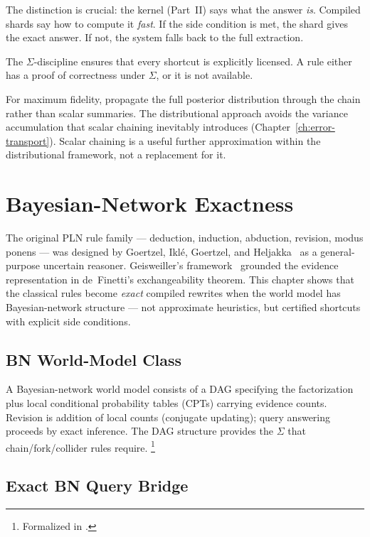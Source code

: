 \documentclass[11pt,openany]{report}
\begin{document}
The distinction is crucial: the kernel (Part~II) says what the answer
\emph{is}.  Compiled shards say how to compute it \emph{fast}.  If
the side condition is met, the shard gives the exact answer.  If not,
the system falls back to the full extraction.

The $\Sigma$-discipline ensures that every shortcut is explicitly
licensed.  A rule either has a proof of correctness under $\Sigma$,
or it is not available.

For maximum fidelity, propagate the full posterior distribution
through the chain rather than scalar summaries.  The distributional
approach avoids the variance accumulation that scalar chaining
inevitably introduces (Chapter~\ref{ch:error-transport}).  Scalar
chaining is a useful further approximation within the distributional
framework, not a replacement for it.


\chapter{Bayesian-Network Exactness}
\label{ch:bn-models}

The original PLN rule family --- deduction, induction, abduction,
revision, modus ponens --- was designed by Goertzel, Iklé, Goertzel,
and Heljakka~\cite{goertzel2009pln} as a general-purpose uncertain
reasoner.  Geisweiller's \nuPLN{} framework~\cite{nuPLN2026} grounded
the evidence representation in de~Finetti's exchangeability theorem.
This chapter shows that the classical rules become \emph{exact}
compiled rewrites when the world model has Bayesian-network structure
--- not approximate heuristics, but certified shortcuts with explicit
side conditions.

\section{BN World-Model Class}

A Bayesian-network world model consists of a DAG specifying the
factorization plus local conditional probability tables (CPTs) carrying
evidence counts.  Revision is addition of local counts (conjugate
updating); query answering proceeds by exact inference.  The DAG
structure provides the $\Sigma$ that chain/fork/collider rules
require.%
\footnote{Formalized in
.}


\section{Exact BN Query Bridge}
\end{document}
